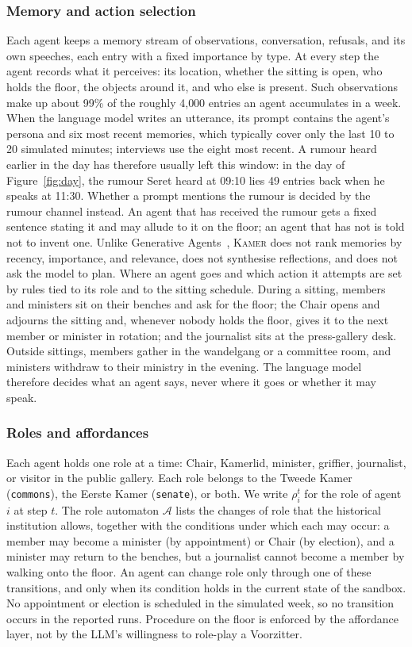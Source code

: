\documentclass[sigconf,review,anonymous]{acmart}
\newcommand{\sys}{\textsc{Kamer}}
\begin{document}
\subsubsection{Memory and action selection}
\label{sec:memory}
Each agent keeps a memory stream
of observations, conversation, refusals, and its own speeches, each entry
with a fixed importance by type. At every step the agent records what it
perceives: its location, whether the sitting is open, who holds the floor,
the objects around it, and who else is present. Such observations make up
about 99\% of the roughly 4{,}000 entries an agent accumulates in a week.
When the language model writes an utterance, its prompt contains the
agent's persona and six most recent memories, which typically cover only
the last 10 to 20 simulated minutes; interviews use the eight most recent.
A rumour heard earlier in the day has therefore usually left this window:
in the day of Figure~\ref{fig:day}, the rumour Seret heard at 09:10 lies
49 entries back when he speaks at 11:30. Whether a prompt mentions the
rumour is decided by the rumour channel instead. An agent that has
received the rumour gets a fixed sentence stating it and may allude to it
on the floor; an agent that has not is told not to invent one. Unlike
Generative
Agents~\cite{park2023generative}, \sys{} does not rank memories by
recency, importance, and relevance, does not synthesise reflections, and
does not ask the model to plan. Where an agent goes and which action it
attempts are set by rules tied to its role and to the sitting schedule.
During a sitting,
members and ministers sit on their benches and ask for the floor; the
Chair opens and adjourns the sitting and, whenever nobody holds the floor,
gives it to the next member or minister in rotation; and the journalist
sits at the press-gallery desk. Outside sittings, members gather in the
wandelgang or a committee room, and ministers withdraw to their ministry
in the evening. The language model therefore decides what an agent says,
never where it goes or whether it may speak.

\subsubsection{Roles and affordances}
\label{sec:gating}
Each agent holds one role at a time: Chair,
Kamerlid, minister, griffier, journalist, or visitor in the public gallery.
Each role belongs to the Tweede Kamer (\texttt{commons}), the Eerste Kamer
(\texttt{senate}), or both. We write $\rho_i^t$ for the role of agent $i$
at step $t$. The role automaton $\mathcal{A}$ lists the changes of role
that the historical institution allows, together with the conditions under
which each may occur: a member may become a minister (by appointment) or
Chair (by election), and a minister may return to the benches, but a
journalist cannot become a member by walking onto the floor. An agent can
change role only through one of these transitions, and only when its
condition holds in the current state of the sandbox. No appointment or
election is scheduled in the simulated week, so no transition occurs in the reported runs.
Procedure on the floor is enforced by the affordance layer, not by the
LLM's willingness to role-play a Voorzitter.
\end{document}

